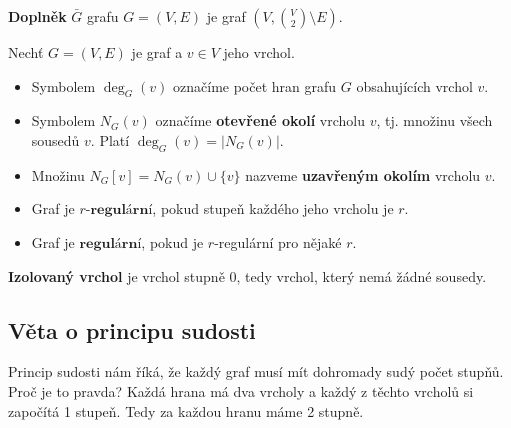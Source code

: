 \medskip

\begin{definition}
\textbf{Doplněk} $\bar{G}$ grafu $G = (V, E)$ je graf $(V, \binom{V}{2} \setminus E)$.
\end{definition}


\bigskip

\begin{definition}
Nechť $G = (V, E)$ je graf a $v \in V$ jeho vrchol.
\begin{itemize}
    \item Symbolem $\deg_G(v)$ označíme počet hran grafu $G$ obsahujících vrchol $v$.
    \item Symbolem $N_G(v)$ označíme \textbf{otevřené okolí} vrcholu $v$, tj. množinu všech sousedů $v$. Platí $\deg_G(v) = |N_G(v)|$.
    \item Množinu $N_G[v] = N_G(v) \cup \{v\}$ nazveme \textbf{uzavřeným okolím} vrcholu $v$.
\end{itemize}
\end{definition}


\bigskip

\begin{definition}
\leavevmode
\begin{itemize}
    \item Graf je $\textbf{$r$-regulární}$, pokud stupeň každého jeho vrcholu je $r$.
    \item Graf je $\textbf{regulární}$, pokud je $r$-regulární pro nějaké $r$.
\end{itemize}
\end{definition}




\begin{definition}
\textbf{Izolovaný vrchol} je vrchol stupně $0$, tedy vrchol, který nemá žádné sousedy.
\end{definition}



\subsection{Věta o principu sudosti}

Princip sudosti nám říká, že každý graf musí mít dohromady sudý počet stupňů. Proč je to pravda? Každá hrana má dva vrcholy a každý z těchto vrcholů si započítá 1 stupeň. Tedy za každou hranu máme 2 stupně. \newline

